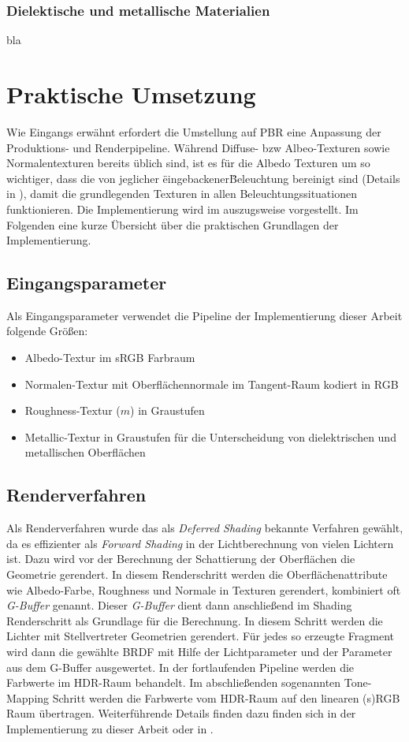 \subsubsection{Dielektische und metallische Materialien}
bla

\section{Praktische Umsetzung}
\label{sec:pbr-umsetzung}

Wie Eingangs erwähnt erfordert die Umstellung auf \ac{PBR} eine Anpassung der Produktions- und Renderpipeline. Während Diffuse- bzw Albeo-Texturen sowie Normalentexturen bereits üblich sind, ist es für die Albedo Texturen um so wichtiger, dass die von jeglicher \"eingebackener\" Beleuchtung bereinigt sind (Details in \cite{Lagarde2011}), damit die grundlegenden Texturen in allen Beleuchtungssituationen funktionieren. Die Implementierung wird im  auszugsweise vorgestellt. Im Folgenden eine kurze Übersicht über die praktischen Grundlagen der Implementierung.

\subsection{Eingangsparameter}

Als Eingangsparameter verwendet die Pipeline der Implementierung dieser Arbeit folgende Größen:
\begin{itemize}
\item Albedo-Textur im sRGB Farbraum
\item Normalen-Textur mit Oberflächennormale im Tangent-Raum kodiert in RGB
\item Roughness-Textur ($m$) in Graustufen
\item Metallic-Textur in Graustufen für die Unterscheidung von dielektrischen und metallischen Oberflächen
\end{itemize}

\subsection{Renderverfahren}

Als Renderverfahren wurde das als \textit{Deferred Shading} bekannte Verfahren gewählt, da es effizienter als \textit{Forward Shading} in der Lichtberechnung von vielen Lichtern ist. Dazu wird vor der Berechnung der Schattierung der Oberflächen die Geometrie gerendert. In diesem Renderschritt werden die Oberflächenattribute wie Albedo-Farbe, Roughness und Normale in Texturen gerendert, kombiniert oft \textit{G-Buffer} genannt. Dieser \textit{G-Buffer} dient dann anschließend im Shading Renderschritt als Grundlage für die Berechnung. In diesem Schritt werden die Lichter mit Stellvertreter Geometrien gerendert. Für jedes so erzeugte Fragment wird dann die gewählte \ac{BRDF} mit Hilfe der Lichtparameter und der Parameter aus dem G-Buffer ausgewertet. In der fortlaufenden Pipeline werden die Farbwerte im HDR-Raum behandelt. Im abschließenden sogenannten Tone-Mapping Schritt werden die Farbwerte vom HDR-Raum auf den linearen (s)RGB Raum übertragen. Weiterführende Details finden dazu finden sich in der Implementierung zu dieser Arbeit oder in \cite{Shishkovtsov2005}.

